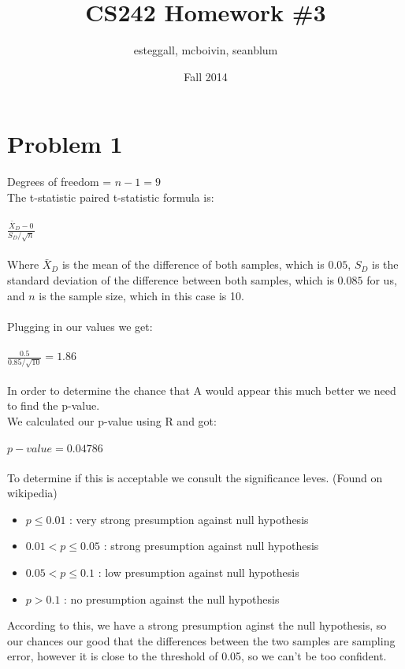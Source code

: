 \documentclass{article}
\title{CS242 Homework \#3}
\author{esteggall, mcboivin, seanblum}
\date{Fall 2014}
\begin{document}
 \maketitle \pagestyle{empty}
\section*{Problem 1}
Degrees of freedom = $n - 1 = 9$\\

The t-statistic paired t-statistic formula is:\\\\
$\frac{\bar{X}_{D} - 0}{S_{D}/\sqrt{n}}$\\\\
Where  $\bar{X}_{D}$ is the mean of the difference of both samples, which is $0.05$, $S_{D}$ is the standard deviation of the difference between both samples, which is $0.085$ for us, and $n$ is the sample size, which in this case is 10.\\\\
Plugging in our values we get:\\\\
$\frac{0.5}{0.85/\sqrt{10}} = 1.86$\\\\
In order to determine the chance that A would appear this much better we need to find the p-value.\\
We calculated our p-value using R and got:\\\\
$p-value = 0.04786$\\\\
To determine if this is acceptable we consult the significance leves. (Found on wikipedia)\\
\begin{itemize}
 \item $p \leq 0.01$  : very strong presumption against null hypothesis\\
 \item $0.01 < p \leq 0.05$  : strong presumption against null hypothesis\\
 \item $0.05 < p \leq 0.1$ : low presumption against null hypothesis\\
 \item $p > 0.1$ : no presumption against the null hypothesis\\
\end{itemize}
According to this, we have a strong presumption aginst the null hypothesis, so our chances our good that the differences between the two samples are sampling error, however it is close to the threshold of 0.05, so we can't be too confident.\\
\end{document}
